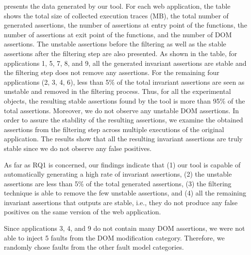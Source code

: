   presents the data generated by our tool. For each web application, the table shows the total size of collected execution traces (MB), the total number of generated \javascript assertions, the number of assertions at entry point of the functions, the number
of assertions at exit point of the functions, and the number of DOM assertions. The unstable assertions before the filtering as well as the stable assertions after the filtering step are also presented. 
As shown in the table, for applications 1, 5, 7, 8, and 9, all the generated invariant assertions are stable and the filtering step does not remove any assertions. For the remaining four applications (2, 3, 4, 6), less than 5\% of the total invariant assertions are seen as unstable and removed in the filtering process. Thus, for all the experimental objects, the resulting stable assertions found by the tool is more than 95\% of the total assertions. Moreover, we do not observe any unstable DOM assertions. %
In order to assure the stability of the resulting assertions, we examine the obtained assertions from the filtering step across multiple executions of the original application. The results show that all the resulting invariant assertions are truly stable since we do not observe any false positives.




As far as RQ1 is concerned, our findings indicate that (1) our tool is capable of automatically generating a high rate of \javascript invariant assertions, (2) the unstable assertions are less than 5\% of the total generated assertions, (3) the filtering technique is able to remove the few unstable assertions, and (4) all the remaining invariant assertions that \jsart outputs are stable, i.e., they do not produce any false positives on the same version of the web application.

%
 Since applications 3, 4, and 9 do not contain many DOM assertions, we were not able to inject 5 faults from the DOM modification category. Therefore, we randomly chose faults from the other fault model  categories.


